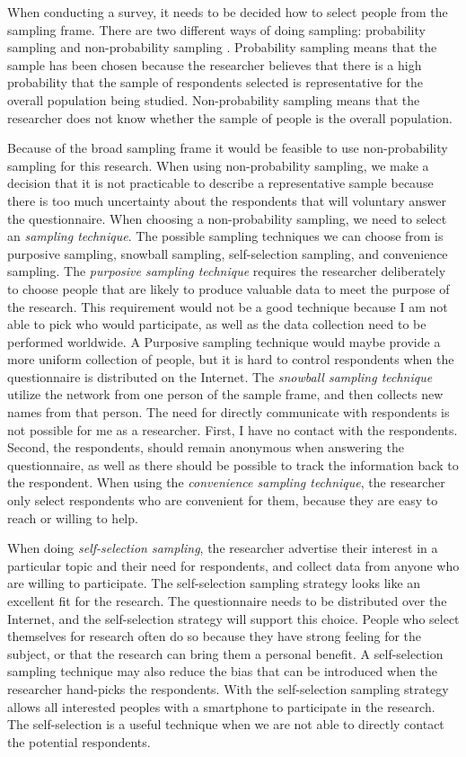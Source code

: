     When conducting a survey, it needs to be decided how to select people from the sampling frame. There are two different ways of doing sampling: probability sampling and non-probability sampling \cite{empiriske}. Probability sampling means that the sample has been chosen because the researcher believes that there is a high probability that the sample of respondents selected is representative for the overall population being studied. Non-probability sampling means that the researcher does not know whether the sample of people is the overall population.

    Because of the broad sampling frame it would be feasible to use non-probability sampling for this research. When using non-probability sampling, we make a decision that it is not practicable to describe a representative sample because there is too much uncertainty about the respondents that will voluntary answer the questionnaire. When choosing a non-probability sampling, we need to select an {\it sampling technique}. The possible sampling techniques we can choose from is purposive sampling, snowball sampling, self-selection sampling, and convenience sampling. The {\it purposive sampling technique} requires the researcher deliberately to choose people that are likely to produce valuable data to meet the purpose of the research. This requirement would not be a good technique because I am not able to pick who would participate, as well as the data collection need to be performed worldwide. A Purposive sampling technique would maybe provide a more uniform collection of people, but it is hard to control respondents when the questionnaire is distributed on the Internet.
    The {\it snowball sampling technique} utilize the network from one person of the sample frame, and then collects new names from that person. The need for directly communicate with respondents is not possible for me as a researcher. {First}, I have no contact with the respondents. {Second}, the respondents, should remain anonymous when answering the questionnaire, as well as there should be possible to track the information back to the respondent.
    When using the {\it convenience sampling technique}, the researcher only select respondents who are convenient for them, because they are easy to reach or willing to help.

    When doing {\it self-selection sampling}, the researcher advertise their interest in a particular topic and their need for respondents, and collect data from anyone who are willing to participate. The self-selection sampling strategy looks like an excellent fit for the research. The questionnaire needs to be distributed over the Internet, and the self-selection strategy will support this choice. People who select themselves for research often do so because they have strong feeling for the subject, or that the research can bring them a personal benefit. A self-selection sampling technique may also reduce the bias that can be introduced when the researcher hand-picks the respondents. With the self-selection sampling strategy allows all interested peoples with a smartphone to participate in the research. The self-selection is a useful technique when we are not able to directly contact the potential respondents.

